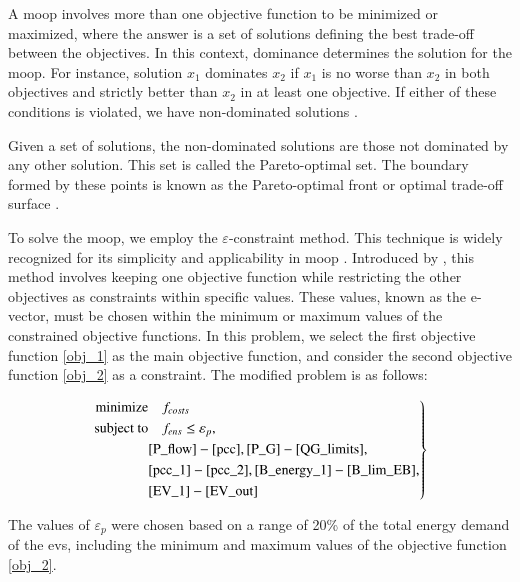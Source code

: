 \documentclass[preprint, 10pt, 5p]{elsarticle}
\begin{document}
A \gls{moop} involves more than one objective function to be minimized or maximized, where the answer is a set of solutions defining the best trade-off between the objectives. In this context, dominance determines the solution for the \gls{moop}. For instance, solution $x_1$  dominates $x_2$ if $x_1$ is no worse 
than $x_2$ in both objectives and strictly better than $x_2$ in at least one objective. If either of these conditions is violated, we have non-dominated solutions \cite{deb11}.

Given a set of solutions, the non-dominated solutions are those not dominated 
by any other solution. This set is called the Pareto-optimal set. 
The boundary formed by these points is known as the Pareto-optimal front or 
optimal trade-off surface \cite{boyd2004}.

To solve the \gls{moop}, we employ the $\varepsilon$-constraint method. 
This technique is widely recognized for its simplicity and applicability 
in \gls{moop} \cite{chiandussi2012}.
Introduced by \cite{haimes71}, this method involves keeping one objective 
function while restricting the other objectives as constraints within specific 
values. These values, known as the e-vector, must be chosen within the minimum 
or maximum values of the constrained objective functions. 
In this problem, we select the first objective function \eqref{obj_1} as 
the main objective function, and consider the second objective 
function \eqref{obj_2} as a constraint. The modified problem is as follows:

\begin{equation}
    \left.
    \begin{aligned}
    \text{minimize} &\quad \text{$f_{costs}$}\\
    \text{subject to}&\quad \text{$f_{ens}$} \leq \text{$\varepsilon_{p}$},\\
    &\eqref{P_flow} - \eqref{pcc}, \eqref{P_G}-\eqref{QG_limits},\\
    &\eqref{pcc_1}-\eqref{pcc_2}, \eqref{B_energy_1}-\eqref{B_lim_EB},\\
    &\eqref{EV_1}-\eqref{EV_out} \\
    \end{aligned}
    \right\}
    \label{final_equation}
\end{equation}

The values of $\varepsilon_{p}$ were chosen based on a range of 20\% of the 
total energy demand of the \glspl{ev}, including the minimum and maximum values 
of the objective function \eqref{obj_2}. 
\end{document}
